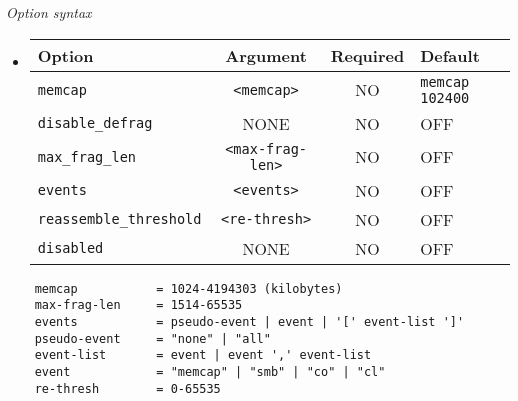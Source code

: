 \documentclass[english]{report}
\begin{document}
\textit{Option syntax}
\begin{itemize}

\item[]
\begin{tabular}{|l|c|c|p{6cm}|}
\hline
Option & Argument & Required & Default\\
\hline
\hline
\texttt{memcap} & \texttt{<memcap>} & NO & \texttt{memcap 102400}\\
\hline
\texttt{disable\_defrag} & NONE & NO & OFF\\
\hline
\texttt{max\_frag\_len} & \texttt{<max-frag-len>} & NO & OFF\\
\hline
\texttt{events} & \texttt{<events>} & NO & OFF\\
\hline
\texttt{reassemble\_threshold} & \texttt{<re-thresh>} & NO & OFF\\
\hline
\texttt{disabled} & NONE & NO & OFF\\
\hline
\end{tabular}
\end{itemize}

\footnotesize
\begin{verbatim}
    memcap           = 1024-4194303 (kilobytes)
    max-frag-len     = 1514-65535
    events           = pseudo-event | event | '[' event-list ']'
    pseudo-event     = "none" | "all"
    event-list       = event | event ',' event-list
    event            = "memcap" | "smb" | "co" | "cl"
    re-thresh        = 0-65535
\end{verbatim}
\normalsize
\end{document}
